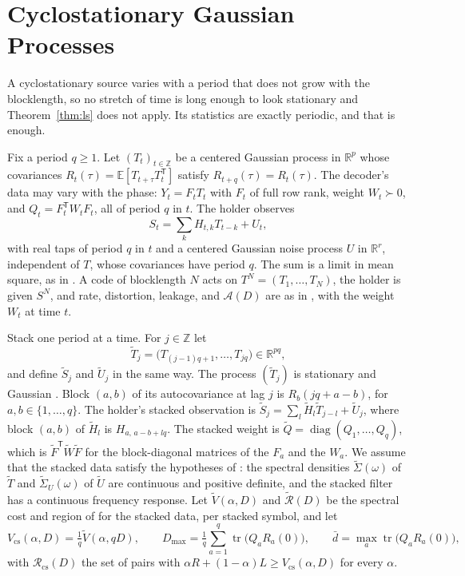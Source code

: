 \documentclass[11pt,onecolumn]{IEEEtran}
\newcommand{\E}{\mathbb{E}}
\newcommand{\R}{\mathbb{R}}
\newcommand{\tr}{\operatorname{tr}}
\newcommand{\tS}{\tilde\Sigma}
\begin{document}
\section{Cyclostationary Gaussian Processes}
\label{sec:cyclo}

A cyclostationary source varies with a period that does not grow with
the blocklength, so no stretch of time is long enough to look
stationary and Theorem~\ref{thm:ls} does not apply. Its statistics are
exactly periodic, and that is enough.

Fix a period $q\ge1$. Let $(T_t)_{t\in\mathbb Z}$ be a centered
Gaussian process in $\R^p$ whose covariances
$R_t(\tau)=\E[T_{t+\tau}T_t^{\mathsf T}]$ satisfy
$R_{t+q}(\tau)=R_t(\tau)$. The decoder's data may vary with the phase:
$Y_t=F_tT_t$ with $F_t$ of full row rank, weight $W_t\succ0$, and
$Q_t=F_t^{\mathsf T}W_tF_t$, all of period $q$ in $t$. The holder
observes
\[
S_t=\sum_kH_{t,k}T_{t-k}+U_t ,
\]
with real taps of period $q$ in $t$ and a centered Gaussian noise
process $U$ in $\R^r$, independent of $T$, whose covariances have period
$q$. The sum is a limit in mean square, as in \cite{part2}. A
code of blocklength $N$ acts on $T^N=(T_1,\dots,T_N)$, the holder is
given $S^N$, and rate, distortion, leakage, and $\mathcal A(D)$ are as
in \cite{part2}, with the weight $W_t$ at time $t$.

Stack one period at a time. For $j\in\mathbb Z$ let
\[
\tilde T_j=\bigl(T_{(j-1)q+1},\dots,T_{jq}\bigr)\in\R^{pq},
\]
and define $\tilde S_j$ and $\tilde U_j$ in the same way. The process
$(\tilde T_j)$ is stationary and Gaussian \cite{gladyshev1961}. Block
$(a,b)$ of its autocovariance at lag $j$ is $R_b(jq+a-b)$, for
$a,b\in\{1,\dots,q\}$. The holder's stacked observation is
$\tilde S_j=\sum_l\tilde H_l\tilde T_{j-l}+\tilde U_j$, where block
$(a,b)$ of $\tilde H_l$ is $H_{a,\,a-b+lq}$. The stacked weight is
$\tilde Q=\operatorname{diag}(Q_1,\dots,Q_q)$, which is
$\tilde F^{\mathsf T}\tilde W\tilde F$ for the block-diagonal matrices
of the $F_a$ and the $W_a$. We assume that the
stacked data satisfy the hypotheses of \cite{part2}: the spectral
densities $\tS(\omega)$ of $\tilde T$ and $\tS_U(\omega)$ of $\tilde U$
are continuous and positive definite, and the stacked filter has a
continuous frequency response. Let $\tilde V(\alpha,D)$ and
$\tilde{\mathcal R}(D)$ be the spectral cost and region of \cite{part2}
for the stacked data, per stacked symbol, and let
\begin{equation}
V_{\mathrm{cs}}(\alpha,D)=\tfrac1q\tilde V(\alpha,qD),\qquad
D_{\max}=\tfrac1q\sum_{a=1}^q\tr\bigl(Q_aR_a(0)\bigr),\qquad
\bar d=\max_a\tr\bigl(Q_aR_a(0)\bigr),
\label{eq:vcs}
\end{equation}
with $\mathcal R_{\mathrm{cs}}(D)$ the set of pairs with
$\alpha R+(1-\alpha)L\ge V_{\mathrm{cs}}(\alpha,D)$ for every $\alpha$.
\end{document}
